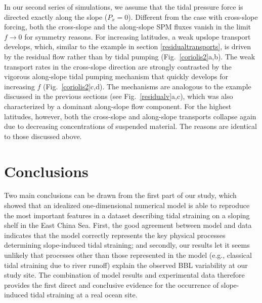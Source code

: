 In our second series of simulations, we assume that the tidal pressure
force is directed exactly along the slope ($P_x=0$). Different from
the case with cross-slope forcing, both the cross-slope and the
along-slope SPM fluxes vanish in the limit $f \rightarrow 0$ for
symmetry reasons. For increasing latitudes, a weak upslope transport
develops, which, similar to the example in section
\ref{residualtransports}, is driven by the residual flow rather than
by tidal pumping (Fig.\ \ref{coriolis2}a,b). The weak transport rates
in the cross-slope direction are strongly contrasted by the vigorous
along-slope tidal pumping mechanism that quickly develops for
increasing $f$ (Fig.\ \ref{coriolis2}c,d). The mechanisms are analogous
to the example discussed in the previous sections (see
Fig.\ \ref{residualv}a,c), which was also characterized by a dominant
along-slope flow component. For the highest latitudes, however, both
the cross-slope and along-slope transports collapse again due to
decreasing concentrations of suspended material. The reasons are
identical to those discussed above.

\section{Conclusions} \label{conclusions}
Two main conclusions can be drawn from the first part of our study,
which showed that an idealized one-dimensional numerical model is able
to reproduce the most important features in a dataset describing tidal
straining on a sloping shelf in the East China Sea. First, the good
agreement between model and data indicates that the model correctly
represents the key physical processes determining slope-induced tidal
straining; and secondly, our results let it seems unlikely that
processes other than those represented in the model (e.g., classical
tidal straining due to river runoff) explain the observed BBL
variability at our study site. The combination of model results and
experimental data therefore provides the first direct and conclusive
evidence for the occurrence of slope-induced tidal straining at a real
ocean site.

